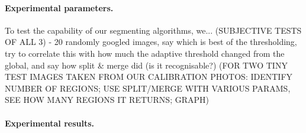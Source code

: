 \paragraph{Experimental parameters.}
To test the capability of our segmenting algorithms, we...
(SUBJECTIVE TESTS OF ALL 3) - 20 randomly googled images, say which is best of the thresholding, try to correlate this with how much the adaptive threshold changed from the global, and say how split \& merge did (is it recognisable?)
(FOR TWO TINY TEST IMAGES TAKEN FROM OUR CALIBRATION PHOTOS: IDENTIFY NUMBER OF REGIONS; USE SPLIT/MERGE WITH VARIOUS PARAMS, SEE HOW MANY REGIONS IT RETURNS; GRAPH)

\paragraph{Experimental results.}





